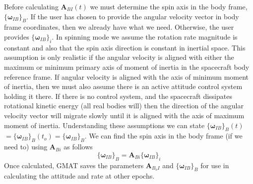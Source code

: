 Before calculating $\mathbf{A}_{BI}(t)$ we must determine the spin axis in the
body frame, $\{\boldsymbol\omega_{IB}\}_B$.  If the user has chosen to provide
the angular velocity vector in body frame coordinates, then we already have what
we need.  Otherwise, the user provides $\{\boldsymbol\omega_{IB}\}_i$.
In spinning mode we assume the rotation rate magnitude is constant and also that
the spin axis direction is constant in inertial space.  This assumption is only
realistic if the angular velocity is aligned with either the maximum or minimum
primary axis of moment of inertia in the spacecraft body reference frame.  If
angular velocity is aligned with the axis of minimum moment of inertia, then we
must also assume there is an active attitude control system holding it there.
If there is no control system, and the spacecraft dissipates rotational kinetic
energy (all real bodies will) then the direction of the angular velocity vector
will migrate slowly until it is aligned with the axis of maximum moment of
inertia.  Understanding these assumptions we can state
$\{ \boldsymbol\omega_{IB} \}_B (t)$ $ = \{\boldsymbol\omega_{IB} \}_B (t_o) =
\{ \boldsymbol\omega_{IB} \}_B$.  We can find the spin axis in the body frame
(if we need to) using $\mathbf{A}_{Bi}$ as follows
%
\begin{equation}
    \{ \boldsymbol\omega_{IB}\}_B = \mathbf{A}_{Bi} \{ \boldsymbol\omega_{IB}\}_i
    \label{Eq:AngularVelocityBody}
\end{equation}
%
Once calculated, GMAT saves the parameters $\mathbf{A}_{B_{o}I}$ and
$\{\boldsymbol\omega_{IB}\}_B$ for use in calculating the attitude and rate at
other epochs.

